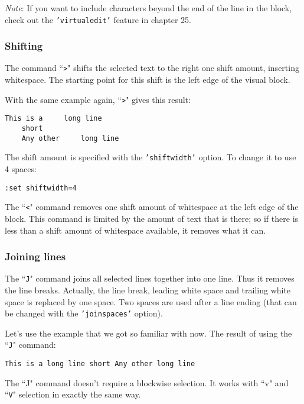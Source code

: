\emph{Note}:
If you want to include characters beyond the end of the line in the block, check out the \texttt{'virtualedit'} feature in chapter 25.

\subsubsection{Shifting}
The command ``\texttt{>}" shifts the selected text to the right one shift amount, inserting whitespace.
The starting point for this shift is the left edge of the visual block.

With the same example again, ``\texttt{>}" gives this result:

\begin{Verbatim}[samepage=true]
    This is a     long line
    short
    Any other     long line
\end{Verbatim}

The shift amount is specified with the \texttt{'shiftwidth'} option.
To change it to use 4 spaces:

\begin{Verbatim}[samepage=true]
 :set shiftwidth=4
\end{Verbatim}

The ``\texttt{<}" command removes one shift amount of whitespace at the left edge of the block.
This command is limited by the amount of text that is there; so if there is less than a shift amount of whitespace available, it removes what it can.


\subsubsection{Joining lines}
The ``\texttt{J}" command joins all selected lines together into one line.
Thus it removes the line breaks.
Actually, the line break, leading white space and trailing white space is replaced by one space.
Two spaces are used after a line ending (that can be changed with the \texttt{'joinspaces'} option).

Let's use the example that we got so familiar with now.
The result of using the ``\texttt{J}" command:

\begin{Verbatim}[samepage=true]
    This is a long line short Any other long line
\end{Verbatim}

The ``J" command doesn't require a blockwise selection.
It works with ``v" and ``\texttt{V}" selection in exactly the same way.


